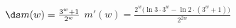 {$\ds m(w) = \frac{3^w+1}{2^w}$
}
{$m'(w) = \frac{2^w\big(\ln 3\cdot 3^w-\ln 2\cdot (3^w+1)\big)}{2^{2w}}$
}

